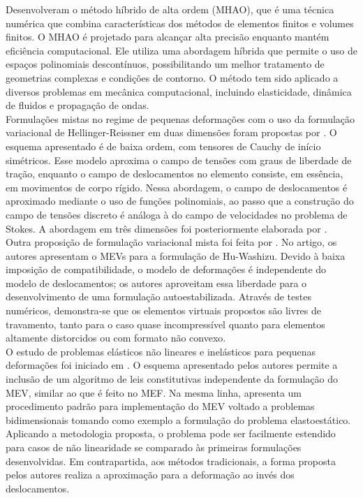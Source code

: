 \indent \citet{DiPietroErn2015hybrid} Desenvolveram o método híbrido de alta ordem (MHAO), que é uma técnica numérica que combina características dos métodos de elementos finitos e volumes finitos. O MHAO é projetado para alcançar alta precisão enquanto mantém eficiência computacional. Ele utiliza uma abordagem híbrida que permite o uso de espaços polinomiais descontínuos, possibilitando um melhor tratamento de geometrias complexas e condições de contorno. O método tem sido aplicado a diversos problemas em mecânica computacional, incluindo elasticidade, dinâmica de fluidos e propagação de ondas. \\
\indent Formulações mistas no regime de pequenas deformações com o uso da formulação variacional de Hellinger-Reissner em duas dimensões foram propostas por \citet{stressdisplacementvirtualelementmethodplaneelasticityproblems2017a}. O esquema apresentado é de baixa ordem, com tensores de Cauchy de início simétricos. Esse modelo aproxima o campo de tensões com graus de liberdade de tração, enquanto o campo de deslocamentos no elemento consiste, em essência, em movimentos de corpo rígido. Nessa abordagem, o campo de deslocamentos é aproximado mediante o uso de funções polinomiais, ao passo que a construção do campo de tensões discreto é análoga à do campo de velocidades no problema de Stokes. A abordagem em três dimensões foi posteriormente elaborada por \citet{threedimensionalhellingerreissnervirtualelementmethodlinearelasticityproblems2020}. \\
\indent Outra proposição de formulação variacional mista foi feita por \citet{huwashizuvariationalapproachselfstabilizedvirtualelements2dlinearelastostatics2023}. No artigo, os autores apresentam o MEVs para a formulação de Hu-Washizu. Devido à baixa imposição de compatibilidade, o modelo de deformações é independente do modelo de deslocamentos; os autores aproveitam essa liberdade para o desenvolvimento de uma formulação autoestabilizada. Através de testes numéricos, demonstra-se que os elementos virtuais propostos são livres de travamento, tanto para o caso quase incompressível quanto para elementos altamente distorcidos ou com formato não convexo. \\
\indent O estudo de problemas elásticos não lineares e inelásticos para pequenas deformações foi iniciado em \citet{virtualelementmethodelasticinelasticproblemspolytopemeshes2015a}. O esquema apresentado pelos autores permite a inclusão de um algoritmo de leis constitutivas independente da formulação do MEV, similar ao que é feito no MEF. Na mesma linha, \citet{arbitraryorder2dvirtualelementspolygonalmeshespartelasticproblem2017a} apresenta um procedimento padrão para implementação do MEV voltado a problemas bidimensionais tomando como exemplo a formulação do problema elastoestático. Aplicando a metodologia proposta, o problema pode ser facilmente estendido para casos de não linearidade se comparado às primeiras formulações desenvolvidas. Em contrapartida, aos métodos tradicionais, a forma proposta pelos autores realiza a aproximação para a deformação ao invés dos deslocamentos.  \\
